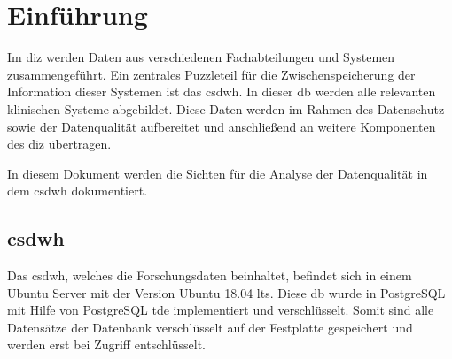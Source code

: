 \chapter{Einführung} \label{chp:intro}

Im \ac{diz} werden Daten aus verschiedenen Fachabteilungen und Systemen zusammengeführt. Ein zentrales Puzzleteil für die Zwischenspeicherung der Information dieser Systemen ist das \acf{csdwh}. In dieser \ac{db} werden alle relevanten klinischen Systeme abgebildet. Diese Daten werden im Rahmen des Datenschutz sowie der Datenqualität aufbereitet und anschließend an weitere Komponenten des \ac{diz} übertragen.

In diesem Dokument werden die Sichten für die Analyse der Datenqualität in dem \ac{csdwh} dokumentiert.

\section{\ac{csdwh}}

 Das \ac{csdwh}, welches die Forschungsdaten beinhaltet, befindet sich in einem Ubuntu Server mit der Version Ubuntu 18.04 \ac{lts}. Diese \ac{db} wurde in PostgreSQL mit Hilfe von PostgreSQL \ac{tde} implementiert und verschlüsselt. Somit sind alle Datensätze der Datenbank verschlüsselt auf der Festplatte gespeichert und werden erst bei Zugriff entschlüsselt.